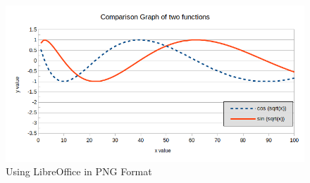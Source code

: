 \begin{figure}[H]
  \centering 
  \includegraphics[width=0.75\columnwidth]{figures/LibrePNG.png}
  \caption {Using LibreOffice in PNG Format}
\end{figure}

